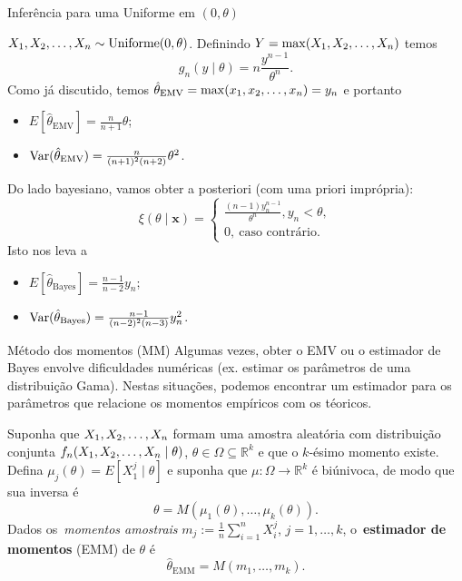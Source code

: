\begin{frame}{Inferência para uma Uniforme em $(0, \theta)$}
\begin{exemplo}
$X_1, X_2, \ldots, X_n \sim \operatorname{Uniforme}(0, \theta)$.
Definindo $Y = \max(X_1, X_2, \ldots, X_n)$ temos 
\[ g_n(y \mid \theta) = n\frac{y^{n-1}}{\theta^n}. \]
Como já discutido, temos $\hat{\theta}_{\text{EMV}} = \max(x_1, x_2, \ldots, x_n) = y_n$ e portanto
\begin{itemize}
 \item $E[\hat{\theta}_{\text{EMV}}] = \frac{n}{n + 1}\theta$;
 \item $\operatorname{Var}(\hat{\theta}_{\text{EMV}}) =  \frac{n}{(n + 1)^2(n+2)}\theta^2$.
\end{itemize}
Do lado bayesiano, vamos obter a posteriori (com uma priori imprópria):
  \begin{equation}
  \label{eq:uniform_reference_posterior}
    \xi(\theta \mid \boldsymbol{x})=
 \begin{cases}
     \frac{(n-1)y_n^{n-1}}{\theta^n}, y_n < \theta,\\
     0,\:\text{caso contrário}.
\end{cases}
 \end{equation}
Isto nos leva a
\begin{itemize}
 \item $E[\hat{\theta}_{\text{Bayes}}] = \frac{n-1}{n-2}y_n$;
 \item $\operatorname{Var}(\hat{\theta}_{\text{Bayes}}) =  \frac{n-1}{(n - 2)^2(n-3)}y_n^2$.
\end{itemize}
\end{exemplo}
\end{frame}

\begin{frame}{Método dos momentos (MM)}
 Algumas vezes, obter o EMV ou o estimador de Bayes envolve dificuldades numéricas (ex. estimar os parâmetros de uma distribuição Gama).
 Nestas situações, podemos encontrar um estimador para os parâmetros que relacione os momentos empíricos com os téoricos.
 
 \begin{defn}
 \label{def:method_of_moments}
  Suponha que $X_1, X_2, \ldots, X_n$ formam uma amostra aleatória com distribuição conjunta $f_n(X_1, X_2, \ldots, X_n \mid \theta)$, $\theta \in \Omega \subseteq \mathbb{R}^k$ e que o $k$-ésimo momento existe.
  Defina $\mu_j(\theta) = E[X_1^j \mid \theta]$ e suponha que $\mu : \Omega \to  \mathbb{R}^k$ é biúnivoca, de modo que sua inversa é 
  \[ \theta = M(\mu_1(\theta), \ldots, \mu_k(\theta)).\]
 Dados os~\textit{momentos amostrais} $m_j := \frac{1}{n} \sum_{i=1}^n X_i^j$, $j = 1, \ldots, k$, o~\textbf{estimador de momentos} (EMM) de $\theta$ é 
 \[ \hat{\theta}_{\text{EMM}} = M(m_1, \ldots, m_k). \]
 \end{defn}
\end{frame}

